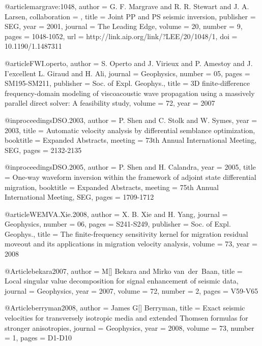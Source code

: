 @article{margrave:1048,
author = {G. F. Margrave and R. R. Stewart and J. A. Larsen},
collaboration = {},
title = {Joint {PP} and {PS} seismic inversion},
publisher = {SEG},
year = {2001},
journal = {The Leading Edge},
volume = {20},
number = {9},
pages = {1048-1052},
url = {http://link.aip.org/link/?LEE/20/1048/1},
doi = {10.1190/1.1487311}
}







@article{FWI.operto,
  author = { S. Operto and J. Virieux and P. Amestoy and J.
I'excellent L. Giraud and H. Ali},
  journal = {Geophysics},
  number = {05},
  pages = {SM195-SM211},
  publisher = {Soc. of Expl. Geophys.},
  title = { 3{D} finite-difference frequency-domain modeling of
viscoacoustic wave propagation using a massively parallel direct
solver: A feasibility study},
  volume = {72},
  year = {2007}}

@inproceedings{DSO.2003,
  author    = {P. Shen and C. Stolk and W. Symes},
  year      = {2003},
  title     = {Automatic velocity analysis by differential semblance
optimization},
  booktitle = {Expanded Abstracts},
  meeting   = {73th Annual International Meeting, SEG},
  pages     = {2132-2135}
}

@inproceedings{DSO.2005,
  author    = {P. Shen and H. Calandra},
  year      = {2005},
  title     = {One-way waveform inversion within the framework of
adjoint state differential migration},
  booktitle = {Expanded Abstracts},
  meeting   = {75th Annual International Meeting, SEG},
  pages     = {1709-1712}
}

@article{WEMVA.Xie.2008,
  author = { X. B. Xie and H. Yang},
  journal = {Geophysics},
  number = {06},
  pages = {S241-S249},
  publisher = {Soc. of Expl. Geophys.},
  title = {The finite-frequency sensitivity kernel for migration
residual moveout and its applications in migration velocity analysis},
  volume = {73},
  year = {2008}}

%
@Article{bekara2007,
  author = 	 {M[] Bekara and Mirko van~der~Baan},
  title = 	 {Local singular value decomposition for signal enhancement of seismic data},
  journal = 	 {Geophysics},
  year = 	 2007,
  volume = 	 72,
  number = 	 2,
  pages = 	 {V59-V65}}

@Article{berryman2008,
  author = 	 {James G[] Berryman},
  title = 	 {Exact seismic velocities for transversely isotropic media and extended Thomsen formulas for stronger anisotropies},
  journal = 	 {Geophysics},
  year = 	 2008,
  volume = 	 73,
  number = 	 1,
  pages = 	 {D1-D10}}

